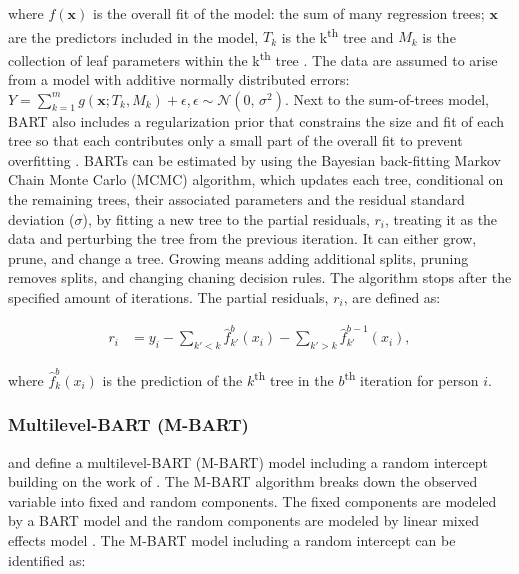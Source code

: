 \documentclass[10pt, a4paper, titlepage]{article}
\begin{document}
where $f(\mathbf{x})$ is the overall fit of the model: the sum of many regression trees; $\textbf{x}$ are the predictors included in the model, $T_{k}$ is the k\textsuperscript{th} tree and $M_{k}$ is the collection of leaf parameters within the k\textsuperscript{th} tree \citep{chipman2010, hill2020, james2021}. The data are assumed to arise from a model with additive normally distributed errors: $Y = \sum^{m}_{k=1}g(\textbf{x}; T_{k}, M_{k}) + \epsilon, \epsilon \sim \mathcal{N}(0,\,\sigma^{2})$.
Next to the sum-of-trees model, BART also includes a regularization prior that constrains the size and fit of each tree so that each contributes only a small part of the overall fit to prevent overfitting \citep{chipman2010, hill2020, james2021}. BARTs can be estimated by using the Bayesian back-fitting Markov Chain Monte Carlo (MCMC) algorithm, which updates each tree, conditional on the remaining trees, their associated parameters and the residual standard deviation ($\sigma$), by fitting a new tree to the partial residuals, $r_{i}$, treating it as the data and perturbing the tree from the previous iteration. It can either grow, prune, and change a tree. Growing means adding additional splits, pruning removes splits, and changing chaning decision rules. The algorithm stops after the specified amount of iterations. The partial residuals, $r_{i}$, are defined as:

\begin{subequations}
\label{eq:partialresiduals}
\begin{align}
r_i &= y_i - \sum_{k' < k} \hat{f}^{b}_{k'}(x_{i}) - \sum_{k' > k} \hat{f}^{b-1}_{k'}(x_{i}), \tag{2}
\end{align}
\end{subequations}

where $\hat{f}^{b}_{k}(x_{i})$ is the prediction of the $k$\textsuperscript{th} tree in the $b$\textsuperscript{th} iteration for person $i$.

\subsubsection{Multilevel-BART (M-BART)}
\citet{chen2020, wagner2020} and \citet{tan2016} define a multilevel-BART (M-BART) model including a random intercept building on the work of \citet{lin2019}. The M-BART algorithm breaks down the observed variable into fixed and random components. The fixed components are modeled by a BART model and the random components are modeled by linear mixed effects model \citep{chen2020, wagner2020, tan2016}.
The M-BART model including a random intercept can be identified as:
\end{document}
